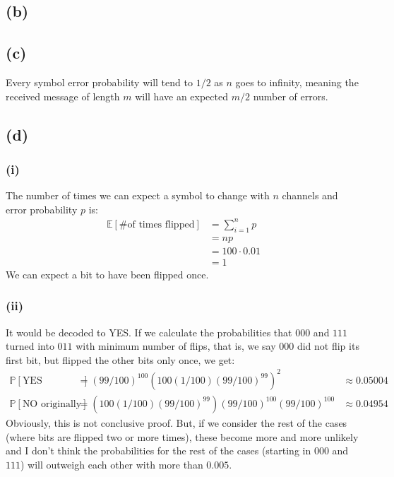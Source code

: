 \documentclass[a4paper, fleqn]{article}
\begin{document}
\subsection{(b)}

\subsection{(c)}
Every symbol error probability will tend to $1/2$ as $n$ goes to infinity, meaning the
received message of length $m$ will have an expected $m/2$ number of errors.

\subsection{(d)}
\subsubsection{(i)}
The number of times we can expect a symbol to change with $n$ channels and error
probability $p$ is:
\begin{align*}
\mathbb{E}[\mbox{\# of times flipped}] &= \sum_{i=1}^n p \\
                                         &= np \\
                                         &= 100\cdot 0.01 \\
                                         &= 1
\end{align*}
We can expect a bit to have been flipped once.

\subsubsection{(ii)}
It would be decoded to YES. If we calculate the probabilities that $000$ and $111$ turned
into $011$ with minimum number of flips, that is, we say $000$ did not flip its
first bit, but flipped the other bits only once, we get:
\begin{align*}
  \mathbb{P}[\mbox{YES originally}] &=(99/100)^{100}(100(1/100)(99/100)^{99})^2 &\approx
  0.05004 \\
  \mathbb{P}[\mbox{NO originally}]&=(100(1/100)(99/100)^{99})(99/100)^{100}(99/100)^{100}
  &\approx 0.04954
\end{align*}
Obviously, this is not conclusive proof. But, if we consider the rest of the cases (where
bits are flipped two or more times), these become more and more unlikely and I don't
think the probabilities for the rest of the cases (starting in $000$ and $111$) will
outweigh each other with more than $0.005$.
\end{document}
